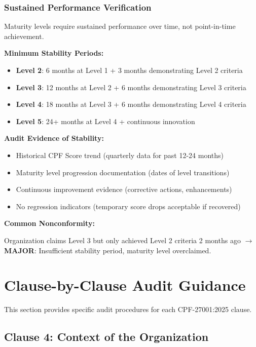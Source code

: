 \documentclass[11pt,a4paper]{article}
\begin{document}
\subsubsection{Sustained Performance Verification}

Maturity levels require sustained performance over time, not point-in-time achievement.

\textbf{Minimum Stability Periods:}

\begin{itemize}
\item \textbf{Level 2}: 6 months at Level 1 + 3 months demonstrating Level 2 criteria
\item \textbf{Level 3}: 12 months at Level 2 + 6 months demonstrating Level 3 criteria
\item \textbf{Level 4}: 18 months at Level 3 + 6 months demonstrating Level 4 criteria
\item \textbf{Level 5}: 24+ months at Level 4 + continuous innovation
\end{itemize}

\textbf{Audit Evidence of Stability:}

\begin{itemize}
\item Historical CPF Score trend (quarterly data for past 12-24 months)
\item Maturity level progression documentation (dates of level transitions)
\item Continuous improvement evidence (corrective actions, enhancements)
\item No regression indicators (temporary score drops acceptable if recovered)
\end{itemize}

\textbf{Common Nonconformity:}

Organization claims Level 3 but only achieved Level 2 criteria 2 months ago $\rightarrow$ \textbf{MAJOR}: Insufficient stability period, maturity level overclaimed.

\section{Clause-by-Clause Audit Guidance}

This section provides specific audit procedures for each CPF-27001:2025 clause.

\subsection{Clause 4: Context of the Organization}
\end{document}
